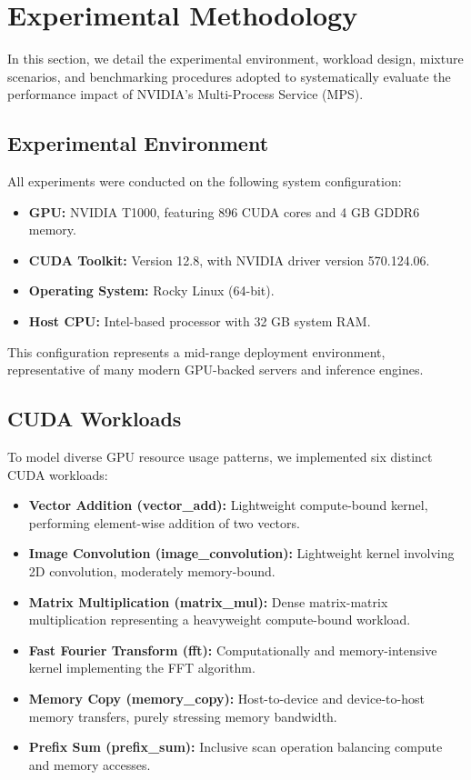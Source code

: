 \documentclass[sigconf,nonacm]{acmart}
\begin{document}
\section{Experimental Methodology}

In this section, we detail the experimental environment, workload design, mixture scenarios, and benchmarking procedures adopted to systematically evaluate the performance impact of NVIDIA’s Multi-Process Service (MPS).

\subsection{Experimental Environment}

All experiments were conducted on the following system configuration:

\begin{itemize}
    \item \textbf{GPU:} NVIDIA T1000, featuring 896 CUDA cores and 4 GB GDDR6 memory.
    \item \textbf{CUDA Toolkit:} Version 12.8, with NVIDIA driver version 570.124.06.
    \item \textbf{Operating System:} Rocky Linux (64-bit).
    \item \textbf{Host CPU:} Intel-based processor with 32 GB system RAM.
\end{itemize}

This configuration represents a mid-range deployment environment, representative of many modern GPU-backed servers and inference engines.

\subsection{CUDA Workloads}

To model diverse GPU resource usage patterns, we implemented six distinct CUDA workloads:

\begin{itemize}
    \item \textbf{Vector Addition (vector\_add):} Lightweight compute-bound kernel, performing element-wise addition of two vectors.
    \item \textbf{Image Convolution (image\_convolution):} Lightweight kernel involving 2D convolution, moderately memory-bound.
    \item \textbf{Matrix Multiplication (matrix\_mul):} Dense matrix-matrix multiplication representing a heavyweight compute-bound workload.
    \item \textbf{Fast Fourier Transform (fft):} Computationally and memory-intensive kernel implementing the FFT algorithm.
    \item \textbf{Memory Copy (memory\_copy):} Host-to-device and device-to-host memory transfers, purely stressing memory bandwidth.
    \item \textbf{Prefix Sum (prefix\_sum):} Inclusive scan operation balancing compute and memory accesses.
\end{itemize}
\end{document}
